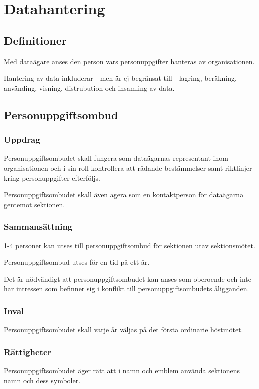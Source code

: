 \section{Datahantering}

\subsection{Definitioner}
	    
	    Med dataägare anses den person vars personuppgifter hanteras av organisationen.
	    
	    Hantering av data inkluderar - men är ej begränsat till - lagring, beräkning, använding, visning, distrubution och insamling av data.

\subsection{Personuppgiftsombud}

\subsubsection{Uppdrag}
 Personuppgiftsombudet skall fungera som dataägarnas representant inom organisationen och i sin roll kontrollera att rådande bestämmelser samt riktlinjer kring personuppgifter efterföljs.
 
 Personuppgiftsombudet skall även agera som en kontaktperson för dataägarna gentemot sektionen.

\subsubsection{Sammansättning}
1-4 personer kan utses till personuppgiftsombud för sektionen utav sektionsmötet.

Personuppgiftsombud utses för en tid på ett år.

Det är nödvändigt att personuppgiftsombudet kan anses som oberoende och inte har intressen som befinner sig i konflikt till personuppgiftsombudets åligganden.

\subsubsection{Inval}
Personuppgiftsombudet skall varje år väljas på det första ordinarie höstmötet.

\subsubsection{Rättigheter}
Personuppgiftsombudet äger rätt att i namn och emblem använda sektionens namn
och dess symboler.


